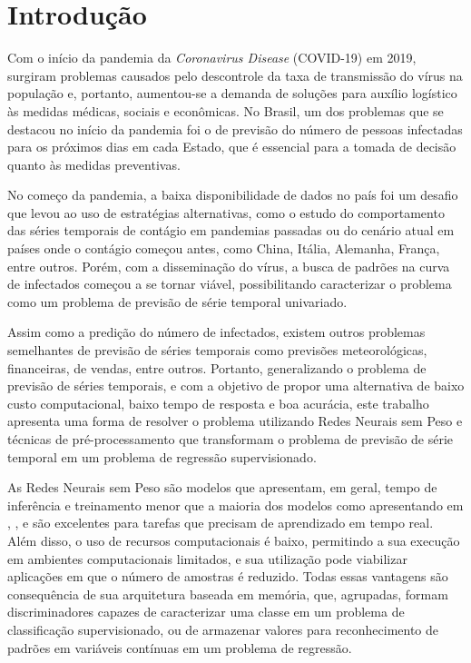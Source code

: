 \chapter{Introdução}

Com o início da pandemia da \textit{Coronavirus Disease} (COVID-19) em 2019, surgiram problemas causados pelo descontrole da taxa de transmissão do vírus na população e, portanto, aumentou-se a demanda de soluções para auxílio logístico às medidas médicas, sociais e econômicas. No Brasil, um dos problemas que se destacou no início da pandemia foi o de previsão do número de pessoas infectadas para os próximos dias em cada Estado, que é essencial para a tomada de decisão quanto às medidas preventivas.

No começo da pandemia, a baixa disponibilidade de dados no país foi um desafio que levou ao uso de estratégias alternativas, como o estudo do comportamento das séries temporais de contágio em pandemias passadas ou do cenário atual em países onde o contágio começou antes, como China, Itália, Alemanha, França, entre outros. Porém, com a disseminação do vírus, a busca de padrões na curva de infectados começou a se tornar viável, possibilitando caracterizar o problema como um problema de previsão de série temporal univariado.

Assim como a predição do número de infectados, existem outros problemas semelhantes de previsão de séries temporais como previsões meteorológicas, financeiras, de vendas, entre outros. Portanto, generalizando o problema de previsão de séries temporais, e com a objetivo de propor uma alternativa de baixo custo computacional, baixo tempo de resposta e boa acurácia, este trabalho apresenta uma forma de resolver o problema utilizando Redes Neurais sem Peso e técnicas de pré-processamento que transformam o problema de previsão de série temporal em um problema de regressão supervisionado.

As Redes Neurais sem Peso são modelos que apresentam, em geral, tempo de inferência e treinamento menor que a maioria dos modelos como apresentando em \citeauthor{advanceswns}, \citeyear{advanceswns} \cite{advanceswns}, e são excelentes para tarefas que precisam de aprendizado em tempo real. Além disso, o uso de recursos computacionais é baixo, permitindo a sua execução em ambientes computacionais limitados, e sua utilização pode viabilizar aplicações em que o número de amostras é reduzido. Todas essas vantagens são consequência de sua arquitetura baseada em memória, que, agrupadas, formam discriminadores capazes de caracterizar uma classe em um problema de classificação supervisionado, ou de armazenar valores para reconhecimento de padrões em variáveis contínuas em um problema de regressão.


